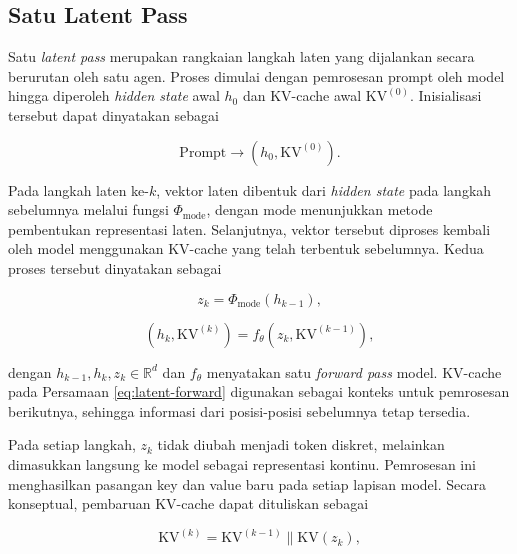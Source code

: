 \subsection{Satu Latent Pass}
\label{subsec:satu-latent-pass}

Satu \textit{latent pass} merupakan rangkaian langkah laten yang dijalankan
secara berurutan oleh satu agen. Proses dimulai dengan pemrosesan prompt
oleh model hingga diperoleh \textit{hidden state} awal $h_0$ dan KV-cache
awal $\mathrm{KV}^{(0)}$. Inisialisasi tersebut dapat dinyatakan sebagai

\begin{equation}
\mathrm{Prompt}
\longrightarrow
\left(h_0,\mathrm{KV}^{(0)}\right).
\label{eq:latent-initialization}
\end{equation}

Pada langkah laten ke-$k$, vektor laten dibentuk dari \textit{hidden state}
pada langkah sebelumnya melalui fungsi $\Phi_{\mathrm{mode}}$, dengan
$\mathrm{mode}$ menunjukkan metode pembentukan representasi laten.
Selanjutnya, vektor tersebut diproses kembali oleh model menggunakan
KV-cache yang telah terbentuk sebelumnya. Kedua proses tersebut dinyatakan
sebagai

\begin{equation}
z_k=\Phi_{\mathrm{mode}}(h_{k-1}),
\label{eq:latent-step}
\end{equation}

\begin{equation}
\left(h_k,\mathrm{KV}^{(k)}\right)
=
f_\theta\left(z_k,\mathrm{KV}^{(k-1)}\right),
\label{eq:latent-forward}
\end{equation}

dengan $h_{k-1},h_k,z_k\in\mathbb{R}^d$ dan $f_\theta$ menyatakan
satu \textit{forward pass} model. KV-cache pada Persamaan
\eqref{eq:latent-forward} digunakan sebagai konteks untuk pemrosesan
berikutnya, sehingga informasi dari posisi-posisi sebelumnya tetap tersedia.

Pada setiap langkah, $z_k$ tidak diubah menjadi token diskret, melainkan
dimasukkan langsung ke model sebagai representasi kontinu. Pemrosesan ini
menghasilkan pasangan key dan value baru pada setiap lapisan model.
Secara konseptual, pembaruan KV-cache dapat dituliskan sebagai

\begin{equation}
\mathrm{KV}^{(k)}
=
\mathrm{KV}^{(k-1)}
\mathbin{\|}\mathrm{KV}(z_k),
\label{eq:latent-kv-update}
\end{equation}

